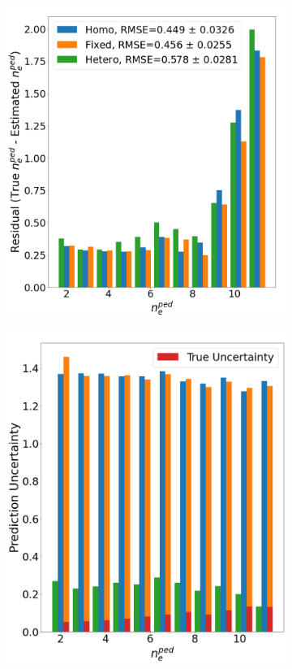 \documentclass[a4paper, twoside, final, 12pt]{article}
\begin{document}
{\begin{figure}
	\centering
	\begin{subfigure}{0.48\linewidth}
		\centering
		\includegraphics[scale=0.23]{ ./src/MLP_residual}
				\caption{}
		\label{subfig:MLPW_RES}
	\end{subfigure}
	\begin{subfigure}{0.48\linewidth}
		\centering
		\includegraphics[scale=0.23]{ ./src/MLP_uq}

\end{subfigure}
\end{figure}}
\end{document}

